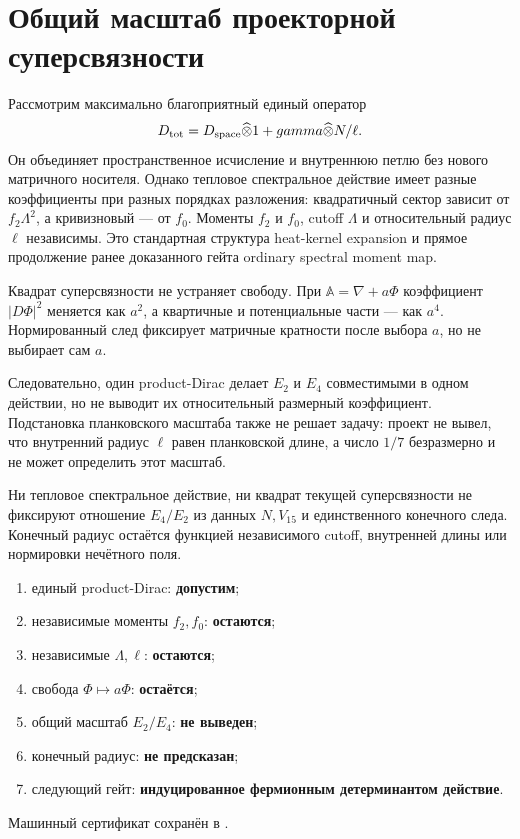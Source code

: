 \chapter{Общий масштаб проекторной суперсвязности}

Рассмотрим максимально благоприятный единый оператор
\begin{equation}
 D_{\rm tot}=D_{\rm space}\widehat\otimes1+gamma\widehat\otimes N/\ell.
\end{equation}
Он объединяет пространственное исчисление и внутреннюю петлю без нового
матричного носителя. Однако тепловое спектральное действие имеет разные
коэффициенты при разных порядках разложения: квадратичный сектор зависит
от $f_2\Lambda^2$, а кривизновый --- от $f_0$. Моменты $f_2$ и $f_0$,
cutoff $\Lambda$ и относительный радиус $\ell$ независимы. Это стандартная
структура heat-kernel expansion и прямое продолжение ранее доказанного
гейта ordinary spectral moment map.

Квадрат суперсвязности не устраняет свободу. При
$\mathbb A=\nabla+a\Phi$ коэффициент $|D\Phi|^2$ меняется как $a^2$, а
квартичные и потенциальные части --- как $a^4$. Нормированный след
фиксирует матричные кратности после выбора $a$, но не выбирает сам $a$.

Следовательно, один product-Dirac делает $E_2$ и $E_4$ совместимыми в
одном действии, но не выводит их относительный размерный коэффициент.
Подстановка планковского масштаба также не решает задачу: проект не вывел,
что внутренний радиус $\ell$ равен планковской длине, а число $1/7$
безразмерно и не может определить этот масштаб.

\begin{theorem}
Ни тепловое спектральное действие, ни квадрат текущей суперсвязности не
фиксируют отношение $E_4/E_2$ из данных $N,V_{15}$ и единственного
конечного следа. Конечный радиус остаётся функцией независимого cutoff,
внутренней длины или нормировки нечётного поля.
\end{theorem}

\begin{protocol}
\begin{enumerate}
 \item единый product-Dirac: \textbf{допустим};
 \item независимые моменты $f_2,f_0$: \textbf{остаются};
 \item независимые $\Lambda,\ell$: \textbf{остаются};
 \item свобода $\Phi\mapsto a\Phi$: \textbf{остаётся};
 \item общий масштаб $E_2/E_4$: \textbf{не выведен};
 \item конечный радиус: \textbf{не предсказан};
 \item следующий гейт: \textbf{индуцированное фермионным детерминантом действие}.
\end{enumerate}
\end{protocol}

Машинный сертификат сохранён в
.